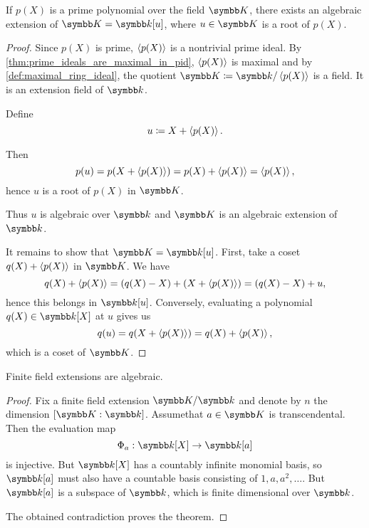 \begin{theorem}\label{thm:algebraic_extension_always_exists}\cite[485]{Knapp2016BAlg}
  If \( p(X) \) is a prime polynomial over the field \( \K \), there exists an algebraic extension of \( \K = \k[u] \), where \( u \in \K \) is a root of \( p(X) \).
\end{theorem}
\begin{proof}
  Since \( p(X) \) is prime, \( \left\langle p(X) \right\rangle \) is a nontrivial prime ideal. By \cref{thm:prime_ideals_are_maximal_in_pid}, \( \left\langle p(X) \right\rangle \) is maximal and by \cref{def:maximal_ring_ideal}, the quotient \( \K \coloneqq \k / \Gen{p(X)} \) is a field. It is an extension field of \( \k \).

  Define
  \begin{equation*}
    u \coloneqq X + \left\langle p(X) \right\rangle.
  \end{equation*}

  Then
  \begin{equation*}
    p(u) = p(X + \left\langle p(X) \right\rangle) = p(X) + \left\langle p(X) \right\rangle = \left\langle p(X) \right\rangle,
  \end{equation*}
  hence \( u \) is a root of \( p(X) \) in \( \K \).

  Thus \( u \) is algebraic over \( \k \) and \( \K \) is an algebraic extension of \( \k \).

  It remains to show that \( \K = \k[u] \). First, take a coset \( q(X) + \left\langle p(X) \right\rangle \) in \( \K \). We have
  \begin{equation*}
    q(X) + \left\langle p(X) \right\rangle = (q(X) - X) + (X + \left\langle p(X) \right\rangle) = (q(X) - X) + u,
  \end{equation*}
  hence this belongs in \( \k[u] \). Conversely, evaluating a polynomial \( q(X) \in \k[X] \) at \( u \) gives us
  \begin{equation*}
    q(u) = q(X + \left\langle p(X) \right\rangle) = q(X) + \left\langle p(X) \right\rangle,
  \end{equation*}
  which is a coset of \( \K \).
\end{proof}

\begin{proposition}\label{thm:finite_field_extensions_are_algebraic}
  Finite field extensions are algebraic.
\end{proposition}
\begin{proof}
  Fix a finite field extension \( \K / \k \) and denote by \( n \) the dimension \( [\K : \k] \). Assume\LEM that \( a \in \K \) is transcendental. Then the evaluation map
  \begin{equation*}
    \Phi_a: \k[X] \to \k[a]
  \end{equation*}
  is injective. But \( \k[X] \) has a countably infinite monomial basis, so \( \k[a] \) must also have a countable basis consisting of \( 1, a, a^2, \ldots \). But \( \k[a] \) is a subspace of \( \k \), which is finite dimensional over \( \k \).

  The obtained contradiction proves the theorem.
\end{proof}

